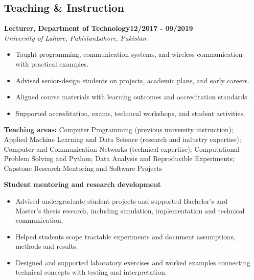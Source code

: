 \documentclass[9pt,letterpaper]{extarticle}
\newcommand{\role}[4]{%
  \Needspace{4\baselineskip}\textbf{#1}\hfill\textbf{#2}\\[-1pt]
  \textit{#3}\hfill\textit{#4}\par}
\begin{document}
\subsection{Teaching \& Instruction}
\role{Lecturer, Department of Technology}{12/2017 - 09/2019}{University of Lahore, Pakistan}{Lahore, Pakistan}
\begin{itemize}
\item Taught programming, communication systems, and wireless communication with practical examples.
\item Advised senior-design students on projects, academic plans, and early careers.
\item Aligned course materials with learning outcomes and accreditation standards.
\item Supported accreditation, exams, technical workshops, and student activities.
\end{itemize}
\vspace{1pt}
{\small\textbf{Teaching areas:} Computer Programming (previous university instruction); Applied Machine Learning and Data Science (research and industry expertise); Computer and Communication Networks (technical expertise); Computational Problem Solving and Python; Data Analysis and Reproducible Experiments; Capstone Research Mentoring and Software Projects}\par
{}\noindent\textbf{Student mentoring and research development}\par
\begin{itemize}
\item Advised undergraduate student projects and supported Bachelor's and Master's thesis research, including simulation, implementation and technical communication.
\item Helped students scope tractable experiments and document assumptions, methods and results.
\item Designed and supported laboratory exercises and worked examples connecting technical concepts with testing and interpretation.
\end{itemize}
\end{document}

